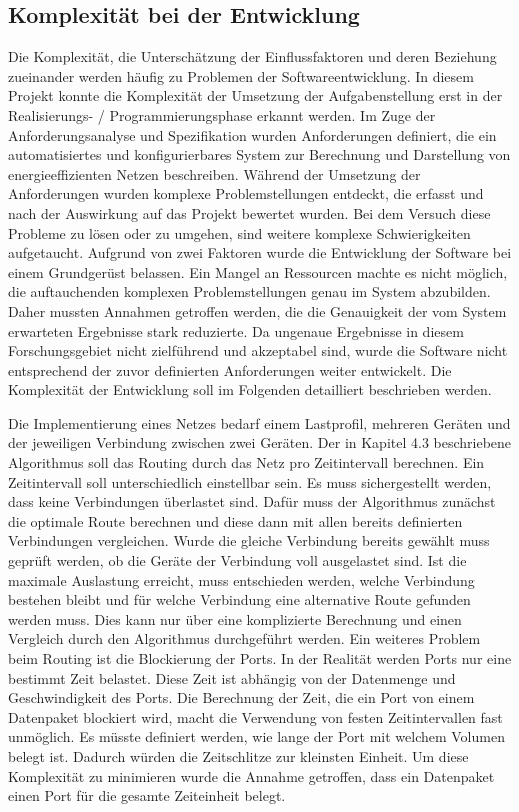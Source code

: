 \documentclass[12pt,titlepage]{article}
\begin{document}
\subsection{Komplexität bei der Entwicklung}
Die Komplexität, die Unterschätzung der Einflussfaktoren und deren Beziehung zueinander werden häufig zu Problemen der Softwareentwicklung. In diesem Projekt konnte die Komplexität der Umsetzung der Aufgabenstellung erst in der Realisierungs- / Programmierungsphase erkannt werden. Im Zuge der Anforderungsanalyse und Spezifikation wurden Anforderungen definiert, die ein automatisiertes und konfigurierbares System zur Berechnung und Darstellung von energieeffizienten Netzen beschreiben. Während der Umsetzung der Anforderungen wurden komplexe Problemstellungen entdeckt, die erfasst und nach der Auswirkung auf das Projekt bewertet wurden. Bei dem Versuch diese Probleme zu lösen oder zu umgehen, sind weitere komplexe Schwierigkeiten aufgetaucht. Aufgrund von zwei Faktoren wurde die Entwicklung der Software bei einem Grundgerüst belassen. Ein Mangel an Ressourcen machte es nicht möglich, die auftauchenden komplexen Problemstellungen genau im System abzubilden. Daher mussten Annahmen getroffen werden, die die Genauigkeit der vom System erwarteten Ergebnisse stark reduzierte. Da ungenaue Ergebnisse in diesem Forschungsgebiet nicht zielführend und akzeptabel sind, wurde die Software nicht entsprechend der zuvor definierten Anforderungen weiter entwickelt. Die Komplexität der Entwicklung soll im Folgenden detailliert beschrieben werden.  


Die Implementierung eines Netzes bedarf einem Lastprofil, mehreren Geräten und der jeweiligen Verbindung zwischen zwei Geräten. Der in Kapitel 4.3 beschriebene Algorithmus soll das Routing durch das Netz pro Zeitintervall berechnen. Ein Zeitintervall soll unterschiedlich einstellbar sein. Es muss sichergestellt werden, dass keine Verbindungen überlastet sind. Dafür muss der Algorithmus zunächst die optimale Route berechnen und diese dann mit allen bereits definierten Verbindungen vergleichen. Wurde die gleiche Verbindung bereits gewählt muss geprüft werden, ob die Geräte der Verbindung voll ausgelastet sind. Ist die maximale Auslastung erreicht, muss entschieden werden, welche Verbindung bestehen bleibt und für welche Verbindung eine alternative Route gefunden werden muss. Dies kann nur über eine komplizierte Berechnung und einen Vergleich durch den Algorithmus durchgeführt werden. Ein weiteres Problem beim Routing ist die Blockierung der Ports. In der Realität werden Ports nur eine bestimmt Zeit belastet. Diese Zeit ist abhängig von der Datenmenge und Geschwindigkeit des Ports. Die Berechnung der Zeit, die ein Port von einem Datenpaket blockiert wird, macht  die Verwendung von festen Zeitintervallen fast unmöglich. Es müsste  definiert werden, wie lange der Port mit welchem Volumen belegt ist. Dadurch würden die Zeitschlitze zur kleinsten Einheit. Um diese Komplexität zu minimieren wurde die Annahme getroffen, dass ein Datenpaket einen Port für die gesamte Zeiteinheit belegt.
\end{document}
